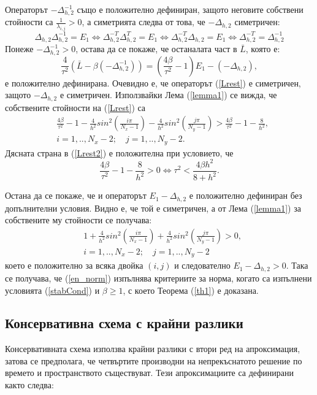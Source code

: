 \documentclass{article}
\newcommand{\be}{\begin{equation}}
\newcommand{\ee}{\end{equation}}
\newcommand{\rf}[1]{(\ref{#1})}
\theoremstyle{remark}
\begin{document}
Операторът $-\Delta_{h,2}^{-1}$ също е положително дефиниран, защото неговите собствени стойности са $\frac{1}{\lambda_{i,j}} > 0$, а симетрията следва от това, че $-\Delta_{h,2}$ симетричен:
\begin{equation*}
\Delta_{h,2}  \Delta_{h,2}^{-1} = E_1 \Leftrightarrow \Delta_{h,2}^{-T}  \Delta_{h,2}^{T} = E_1 \Leftrightarrow \Delta_{h,2}^{-T}  \Delta_{h,2} = E_1 
\Leftrightarrow \Delta_{h,2}^{-T} = \Delta_{h,2}^{-1} 
\end{equation*}
Понеже $-\Delta_{h,2}^{-1} > 0$, остава да се покаже, че останалата част в $\bar L$, която е:
\be\label{Lrest}
\frac{4}{\tau^2}\left( \bar L - \beta ( - \Delta_{h,2}^{-1}) \right) = \left( \frac{4 \beta}{\tau^2} - 1\right) E_1 -(-\Delta_{h,2}),
\ee
е положително дефинирана. Очевидно е, че операторът \rf{Lrest} е симетричен, защото $-\Delta_{h,2}$ е симетричен. Използвайки Лема \rf{lemma1} се вижда, че собствените стойности на \rf{Lrest} са
\begin{align}\label{Lrest2}
 &\frac{4 \beta}{\tau^2} - 1 - \frac{4}{h^2}sin^2(\frac{i \pi}{N_x-1}) - \frac{4}{h^2}sin^2(\frac{j \pi}{N_y-1}) > \frac{4 \beta}{\tau^2} - 1 - \frac{8}{h^2}, \\
&i = 1,..,N_x-2; \quad j = 1, .. , N_y-2. \nonumber
\end{align}
Дясната страна в \rf{Lrest2} е положителна при условието, че
\be\label{stabCond}
\frac{4 \beta}{\tau^2} - 1 - \frac{8}{h^2} > 0  \Leftrightarrow \tau^2 < \frac{4 \beta h^2}{8 + h^2}.
\ee

Остана да се покаже, че и операторът $E_1 - \Delta_{h, 2}$ е положително дефиниран без допълнителни условия. Видно е, че той е симетричен, а от Лема \rf{lemma1} за собствените му стойности се получава:
\begin{align}
&1+ \frac{4}{h^2}sin^2(\frac{i \pi}{N_x-1}) + \frac{4}{h^2}sin^2(\frac{j \pi}{N_y-1}) >0, \nonumber\\
&i = 1,..,N_x-2; \quad j = 1, .. , N_y-2 \nonumber
\end{align}
което е положително за всяка двойка $(i, j)$ и следователно $E_1 - \Delta_{h, 2} > 0$. Така се получава, че \rf{en_norm} изпълнява критериите за норма, когато са изпълнени условията \rf{stabCond} и $\beta \ge 1$, с което Теорема \rf{th1} е доказана.

\subsection{ Консервативна схема с крайни разлики }
Консервативната схема използва крайни разлики с втори ред на апроксимация, затова се предполага, че четвъртите производни на непрекъснатото решение по времето и пространството съществуват.  Тези апроксимациите са дефинирани както следва:
\end{document}
